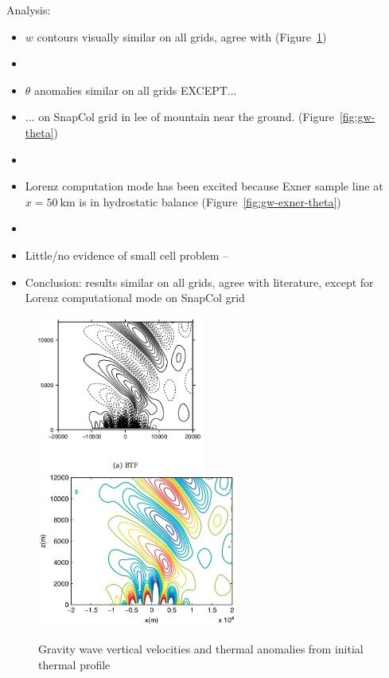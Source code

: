 \documentclass[a4paper]{article}
\begin{document}
Analysis:
\begin{itemize}
	\item $w$ contours visually similar on all grids, agree with \textcite{melvin2010} (Figure~\ref{fig:gw-w})
	\item {}
	\item $\theta$ anomalies similar on all grids EXCEPT...
	\item ... on SnapCol grid in lee of mountain near the ground. (Figure~\ref{fig:gw-theta})
	\item {}
	\item Lorenz computation mode has been excited because Exner sample line at $x = \SI{50}{\kilo\meter}$ is in hydrostatic balance (Figure~\ref{fig:gw-exner-theta})
	\item {}
	\item Little/no evidence of small cell problem -- 
	\item Conclusion: results similar on all grids, agree with literature, except for Lorenz computational mode on SnapCol grid
\end{itemize}

\begin{figure}
	\includegraphics[height=2in]{gw-w-btf.png}
	\includegraphics[height=2in]{melvin-7a.png}
%
	\caption{Gravity wave vertical velocities and thermal anomalies from initial thermal profile}
	\label{fig:gw-w}
\end{figure}
\end{document}
